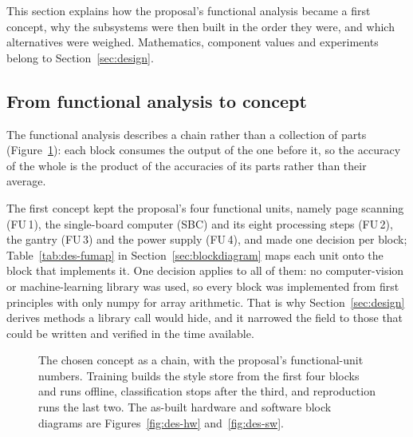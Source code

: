 \label{sec:approach}
This section explains how the proposal's functional analysis became a first concept, why the subsystems were then built in the order they were, and which alternatives were weighed. Mathematics, component values and experiments belong to Section~\ref{sec:design}.

\subsection{From functional analysis to concept}
\label{sec:app-concept}

The functional analysis describes a chain rather than a collection of parts (Figure~\ref{fig:app-concept}): each block consumes the output of the one before it, so the accuracy of the whole is the product of the accuracies of its parts rather than their average.

The first concept kept the proposal's four functional units, namely page scanning (FU\,1), the single-board computer (SBC) and its eight processing steps (FU\,2), the gantry (FU\,3) and the power supply (FU\,4), and made one decision per block; Table~\ref{tab:des-fumap} in Section~\ref{sec:blockdiagram} maps each unit onto the block that implements it. One decision applies to all of them: no computer-vision or machine-learning library was used, so every block was implemented from first principles with only numpy for array arithmetic. That is why Section~\ref{sec:design} derives methods a library call would hide, and it narrowed the field to those that could be written and verified in the time available.

\begin{figure}[htbp]
\centering
{}
\caption{The chosen concept as a chain, with the proposal's functional-unit numbers. Training builds the style store from the first four blocks and runs offline, classification stops after the third, and reproduction runs the last two. The as-built hardware and software block diagrams are Figures~\ref{fig:des-hw} and~\ref{fig:des-sw}.}
\label{fig:app-concept}
\end{figure}

